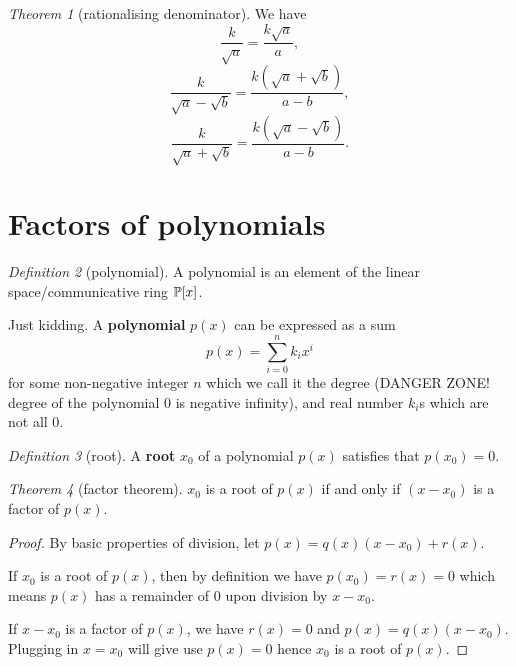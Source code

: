 \documentclass[8pt]{article}
\theoremstyle{remark}
\newtheorem{theorem}{Theorem}[section]
\newtheorem{definition}[theorem]{Definition}
\begin{document}
        \begin{theorem}[rationalising denominator]
            We have
            $$
                \frac{k}{\sqrt{a}} = \frac{k \sqrt{a}}{a},
            $$
            $$
                \frac{k}{\sqrt{a} - \sqrt{b}} = \frac{k(\sqrt{a} + \sqrt{b})}{a - b},
            $$
            $$
                \frac{k}{\sqrt{a} + \sqrt{b}} = \frac{k(\sqrt{a} - \sqrt{b})}{a - b}.
            $$
        \end{theorem}

    \section{Factors of polynomials}
        \begin{definition}[polynomial]
            A polynomial is an element of the linear space/communicative ring $\mathbb{P} [x]$.

            Just kidding. A \textbf{polynomial} $p(x)$ can be expressed as a sum
            $$
                p(x) = \sum_{i = 0}^{n} k_i x^i
            $$
            for some non-negative integer $n$ which we call it the degree (DANGER ZONE! degree of the polynomial 0 is negative infinity), and real number $k_i$s which are not all 0. 
        \end{definition}

        \begin{definition}[root]
            A \textbf{root} $x_0$ of a polynomial $p(x)$ satisfies that $p(x_0) = 0$.
        \end{definition}

        \begin{theorem}[factor theorem]
            $x_0$ is a root of $p(x)$ if and only if $(x - x_0)$ is a factor of $p(x)$.

            \begin{proof}
                By basic properties of division, let $p(x) = q(x) (x - x_0) + r(x)$.

                If $x_0$ is a root of $p(x)$, then by definition we have $p(x_0) = r(x) = 0$ which means $p(x)$ has a remainder of $0$ upon division by $x - x_0$.
                
                If $x - x_0$ is a factor of $p(x)$, we have $r(x) = 0$ and $p(x) = q(x) (x - x_0)$. Plugging in $x = x_0$ will give use $p(x) = 0$ hence $x_0$ is a root of $p(x)$.
            \end{proof}
        \end{theorem}
\end{document}
